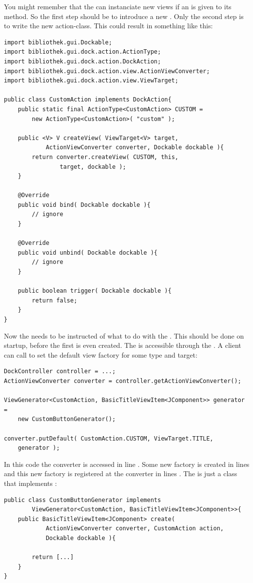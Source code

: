 You might remember that the  can instanciate new views if an  is given to its  method. So the first step should be to introduce a new . Only the second step is to write the new action-class. This could result in something like this:
\begin{lstlisting}
import bibliothek.gui.Dockable;
import bibliothek.gui.dock.action.ActionType;
import bibliothek.gui.dock.action.DockAction;
import bibliothek.gui.dock.action.view.ActionViewConverter;
import bibliothek.gui.dock.action.view.ViewTarget;

public class CustomAction implements DockAction{
	public static final ActionType<CustomAction> CUSTOM =
		new ActionType<CustomAction>( "custom" );
	
	public <V> V createView( ViewTarget<V> target,
			ActionViewConverter converter, Dockable dockable ){
		return converter.createView( CUSTOM, this, 
				target, dockable );
	}
	
	@Override
	public void bind( Dockable dockable ){
		// ignore
	}
	
	@Override
	public void unbind( Dockable dockable ){
		// ignore
	}
	
	public boolean trigger( Dockable dockable ){
		return false;
	}	
}
\end{lstlisting}

Now the  needs to be instructed of what to do with the  . This should be done on startup, before the first \linebreak {} is even created. The  is accessible through the . A client can call  to set the default view factory for some type and target:

\begin{lstlisting}
DockController controller = ...;
ActionViewConverter converter = controller.getActionViewConverter();

ViewGenerator<CustomAction, BasicTitleViewItem<JComponent>> generator =
	new CustomButtonGenerator();

converter.putDefault( CustomAction.CUSTOM, ViewTarget.TITLE, 
	generator );
\end{lstlisting}
In this code the converter is accessed in line . Some new factory is created in lines  and this new factory is registered at the converter in lines . The  is just a class that implements :
\begin{lstlisting}
public class CustomButtonGenerator implements
		ViewGenerator<CustomAction, BasicTitleViewItem<JComponent>>{
	public BasicTitleViewItem<JComponent> create(
			ActionViewConverter converter, CustomAction action,
			Dockable dockable ){
		
		return [...]
	}
}
\end{lstlisting}

